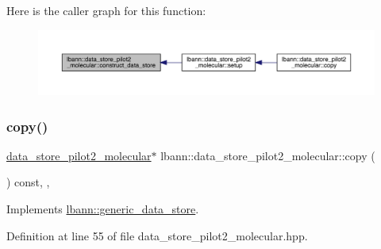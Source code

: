 Here is the caller graph for this function\+:\nopagebreak
\begin{figure}[H]
\begin{center}
\leavevmode
\includegraphics[width=350pt]{classlbann_1_1data__store__pilot2__molecular_a8021fa0a93e39c9d43de6ecc2d72e14e_icgraph}
\end{center}
\end{figure}
\mbox{\label{classlbann_1_1data__store__pilot2__molecular_a1a59e48a8c7ca8efe86509e0d9cd1307}} 
\subsubsection{\texorpdfstring{copy()}{copy()}}
{\footnotesize\ttfamily \hyperlink{classlbann_1_1data__store__pilot2__molecular}{data\+\_\+store\+\_\+pilot2\+\_\+molecular}$\ast$ lbann\+::data\+\_\+store\+\_\+pilot2\+\_\+molecular\+::copy (\begin{DoxyParamCaption}{ }\end{DoxyParamCaption}) const\hspace{0.3cm}{\ttfamily [inline]}, {\ttfamily [override]}, {\ttfamily [virtual]}}



Implements \hyperlink{classlbann_1_1generic__data__store_ae06e089790aa023b839be508a3c020c6}{lbann\+::generic\+\_\+data\+\_\+store}.



Definition at line 55 of file data\+\_\+store\+\_\+pilot2\+\_\+molecular.\+hpp.


